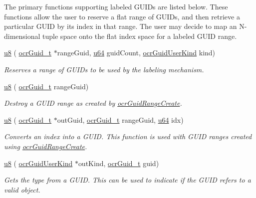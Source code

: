 The primary functions supporting labeled GUIDs are listed below.
These functions allow the user to reserve a flat range of GUIDs,
and then retrieve a particular GUID by its index in that range.
The user may decide to map an N-dimensional tuple space
onto the flat index space for a labeled GUID range.
\begin{DoxyCompactItemize}
\item
  \hyperlink{type_u8}{u8}
  \hyperlink{func_ocrGuidRangeCreate}{}(
  \hyperlink{type_ocrGuid_t}{ocr\-Guid\-\_\-t} $\ast$rangeGuid,
  \hyperlink{type_u64}{u64} guidCount,
  \hyperlink{type_ocrGuidUserKind}{ocrGuidUserKind} kind)
  \begin{DoxyCompactList}
    \small \item \emph{Reserves a range of GUIDs to be used by the
      labeling mechanism.}
  \end{DoxyCompactList}
\item
  \hyperlink{type_u8}{u8}
  \hyperlink{func_ocrGuidRangeDestroy}{}(
  \hyperlink{type_ocrGuid_t}{ocr\-Guid\-\_\-t} rangeGuid)
  \begin{DoxyCompactList}
    \small \item \emph{Destroy a GUID range as created by
      \hyperlink{func_ocrGuidRangeCreate}{ocrGuidRangeCreate}.}
  \end{DoxyCompactList}
\item
  \hyperlink{type_u8}{u8}
  \hyperlink{func_ocrGuidFromIndex}{}(
  \hyperlink{type_ocrGuid_t}{ocr\-Guid\-\_\-t} $\ast$outGuid,
  \hyperlink{type_ocrGuid_t}{ocr\-Guid\-\_\-t} rangeGuid,
  \hyperlink{type_u64}{u64} idx)
  \begin{DoxyCompactList}
    \small \item \emph{Converts an index into a GUID. This function is
      used with GUID ranges created using
      \hyperlink{func_ocrGuidRangeCreate}{ocrGuidRangeCreate}.}
  \end{DoxyCompactList}
\item
  \hyperlink{type_u8}{u8}
  \hyperlink{func_ocrGetGuidKind}{}(
  \hyperlink{type_ocrGuidUserKind}{ocrGuidUserKind} $\ast$outKind,
  \hyperlink{type_ocrGuid_t}{ocr\-Guid\-\_\-t} guid)
  \begin{DoxyCompactList}
    \small \item \emph{Gets the type from a GUID. This can be used to
      indicate if the GUID refers to a valid object.}
  \end{DoxyCompactList}
\end{DoxyCompactItemize}
